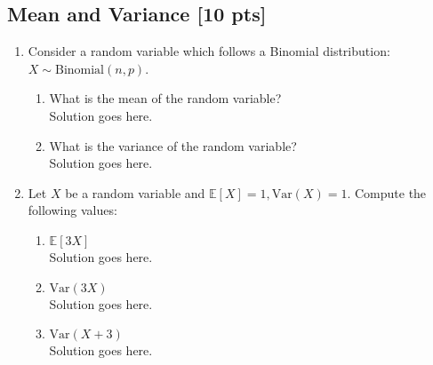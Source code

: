 \documentclass[a4paper]{article}
\theoremstyle{definition}
\newcommand{\Var}{\mathrm{Var}}
\newenvironment{soln}{
    \leavevmode\color{blue}\ignorespaces
}{}
\begin{document}
\subsection{Mean and Variance [10 pts]}
\begin{enumerate}
\item Consider a random variable which follows a Binomial
  distribution: $X \sim \text{Binomial}(n, p)$.
  \begin{enumerate}
  \item What is the mean of the random variable?\\
    \begin{soln}  Solution goes here. \end{soln}
  \item What is the variance of the random variable?\\
    \begin{soln}  Solution goes here. \end{soln}
  \end{enumerate}

\item Let $X$ be a random variable and
  $\mathbb{E}[X] = 1, \Var(X) = 1$. Compute the following values:
  \begin{enumerate}
  \item $\mathbb{E}[3X]$\\
    \begin{soln}  Solution goes here. \end{soln}
  \item $\Var(3X)$\\
    \begin{soln}  Solution goes here. \end{soln}
  \item $\Var(X+3)$\\
    \begin{soln}  Solution goes here. \end{soln}
  \end{enumerate}
\end{enumerate}

\end{document}
